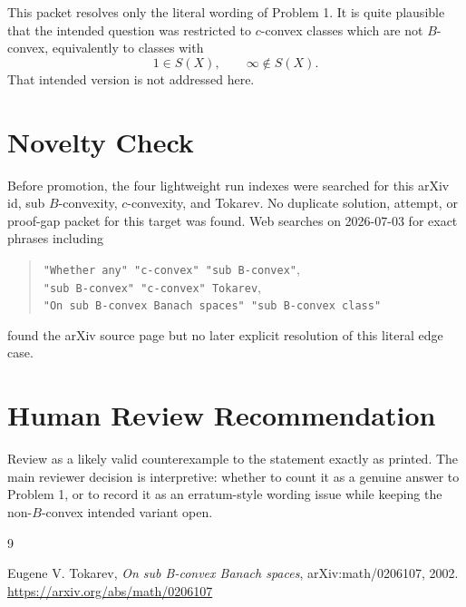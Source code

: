 \documentclass[11pt]{article}
\begin{document}
This packet resolves only the literal wording of Problem 1. It is quite
plausible that the intended question was restricted to \(c\)-convex classes
which are not \(B\)-convex, equivalently to classes with
\[
1\in S(X),\qquad \infty\notin S(X).
\]
That intended version is not addressed here.

\section*{Novelty Check}

Before promotion, the four lightweight run indexes were searched for this
arXiv id, sub \(B\)-convexity, \(c\)-convexity, and Tokarev. No duplicate
solution, attempt, or proof-gap packet for this target was found. Web searches
on 2026-07-03 for exact phrases including
\begin{quote}
\texttt{"Whether any" "c-convex" "sub B-convex"},\\
\texttt{"sub B-convex" "c-convex" Tokarev},\\
\texttt{"On sub B-convex Banach spaces" "sub B-convex class"}
\end{quote}
found the arXiv source page but no later explicit resolution of this literal
edge case.

\section*{Human Review Recommendation}

Review as a likely valid counterexample to the statement exactly as printed.
The main reviewer decision is interpretive: whether to count it as a genuine
answer to Problem 1, or to record it as an erratum-style wording issue while
keeping the non-\(B\)-convex intended variant open.

\begin{thebibliography}{9}

Eugene V. Tokarev,
\emph{On sub B-convex Banach spaces},
arXiv:math/0206107, 2002.
\url{https://arxiv.org/abs/math/0206107}

\end{thebibliography}
\end{document}
